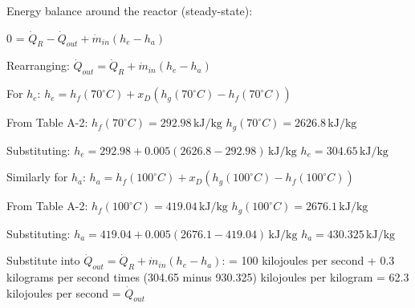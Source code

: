 Energy balance around the reactor (steady-state):  

0 = \( \dot{Q}_R - \dot{Q}_{out} + \dot{m}_{in} (h_e - h_a) \)  

Rearranging:  
\( \dot{Q}_{out} = \dot{Q}_R + \dot{m}_{in} (h_e - h_a) \)  

For \( h_e \):  
\( h_e = h_f(70^\circ C) + x_D(h_g(70^\circ C) - h_f(70^\circ C)) \)  

From Table A-2:  
\( h_f(70^\circ C) = 292.98 \, \text{kJ/kg} \)  
\( h_g(70^\circ C) = 2626.8 \, \text{kJ/kg} \)  

Substituting:  
\( h_e = 292.98 + 0.005(2626.8 - 292.98) \, \text{kJ/kg} \)  
\( h_e = 304.65 \, \text{kJ/kg} \)  

Similarly for \( h_a \):  
\( h_a = h_f(100^\circ C) + x_D(h_g(100^\circ C) - h_f(100^\circ C)) \)  

From Table A-2:  
\( h_f(100^\circ C) = 419.04 \, \text{kJ/kg} \)  
\( h_g(100^\circ C) = 2676.1 \, \text{kJ/kg} \)  

Substituting:  
\( h_a = 419.04 + 0.005(2676.1 - 419.04) \, \text{kJ/kg} \)  
\( h_a = 430.325 \, \text{kJ/kg} \)

Substitute into \( \dot{Q}_{out} = \dot{Q}_R + \dot{m}_{in} (h_e - h_a) \):  
= 100 kilojoules per second + 0.3 kilograms per second times (304.65 minus 930.325) kilojoules per kilogram  
= 62.3 kilojoules per second = \( \dot{Q}_{out} \)
